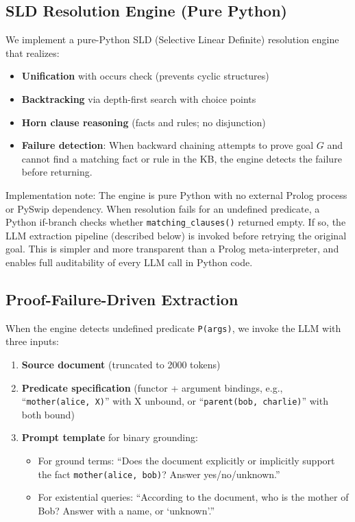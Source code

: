 \documentclass[11pt,letterpaper]{article}
\begin{document}
\subsection{SLD Resolution Engine (Pure Python)}

We implement a pure-Python SLD (Selective Linear Definite) resolution engine that realizes:
\begin{itemize}
  \item \textbf{Unification} with occurs check (prevents cyclic structures)
  \item \textbf{Backtracking} via depth-first search with choice points
  \item \textbf{Horn clause reasoning} (facts and rules; no disjunction)
  \item \textbf{Failure detection}: When backward chaining attempts to prove goal $G$ and cannot find a matching fact or
    rule in the KB, the engine detects the failure before returning.
\end{itemize}

Implementation note: The engine is pure Python with no external Prolog process or PySwip dependency. When resolution fails
for an undefined predicate, a Python if-branch checks whether \texttt{matching\_clauses()} returned empty. If so, the LLM
extraction pipeline (described below) is invoked before retrying the original goal. This is simpler and more transparent than
a Prolog meta-interpreter, and enables full auditability of every LLM call in Python code.

\subsection{Proof-Failure-Driven Extraction}

When the engine detects undefined predicate \texttt{P(args)}, we invoke the LLM with three inputs:

\begin{enumerate}
  \item \textbf{Source document} (truncated to 2000 tokens)
  \item \textbf{Predicate specification} (functor + argument bindings, e.g., ``\texttt{mother(alice, X)}'' with X unbound,
    or ``\texttt{parent(bob, charlie)}'' with both bound)
  \item \textbf{Prompt template} for binary grounding:
  \begin{itemize}
    \item For ground terms: ``Does the document explicitly or implicitly support the fact \texttt{mother(alice, bob)}?
      Answer yes/no/unknown.''
    \item For existential queries: ``According to the document, who is the mother of Bob? Answer with a name, or `unknown'.''
  \end{itemize}
\end{enumerate}
\end{document}
